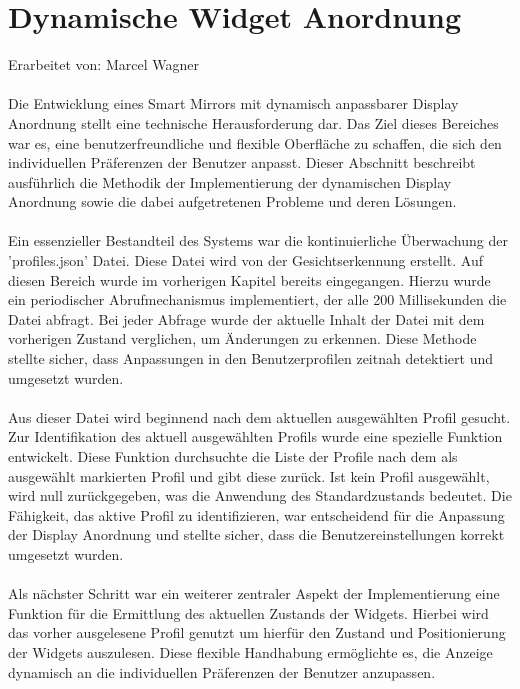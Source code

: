 \section{Dynamische Widget Anordnung}
Erarbeitet von: Marcel Wagner \\ \\
Die Entwicklung eines Smart Mirrors mit dynamisch anpassbarer Display Anordnung stellt eine technische Herausforderung dar. Das Ziel dieses Bereiches war es, eine benutzerfreundliche und flexible Oberfläche zu schaffen, die sich den individuellen Präferenzen der Benutzer anpasst. Dieser Abschnitt beschreibt ausführlich die Methodik der Implementierung der dynamischen Display Anordnung sowie die dabei aufgetretenen Probleme und deren Lösungen. \\ \\
Ein essenzieller Bestandteil des Systems war die kontinuierliche Überwachung der 'profiles.json' Datei. Diese Datei wird von der Gesichtserkennung erstellt. Auf diesen Bereich wurde im vorherigen Kapitel bereits eingegangen. Hierzu wurde ein periodischer Abrufmechanismus implementiert, der alle 200 Millisekunden die Datei abfragt. Bei jeder Abfrage wurde der aktuelle Inhalt der Datei mit dem vorherigen Zustand verglichen, um Änderungen zu erkennen. Diese Methode stellte sicher, dass Anpassungen in den Benutzerprofilen zeitnah detektiert und umgesetzt wurden. \\ \\
Aus dieser Datei wird beginnend nach dem aktuellen ausgewählten Profil gesucht. Zur Identifikation des aktuell ausgewählten Profils wurde eine spezielle Funktion entwickelt. Diese Funktion durchsuchte die Liste der Profile nach dem als ausgewählt markierten Profil und gibt diese zurück. Ist kein Profil ausgewählt, wird null zurückgegeben, was die Anwendung des Standardzustands bedeutet. Die Fähigkeit, das aktive Profil zu identifizieren, war entscheidend für die Anpassung der Display Anordnung und stellte sicher, dass die Benutzereinstellungen korrekt umgesetzt wurden. \\ \\
Als nächster Schritt war ein weiterer zentraler Aspekt der Implementierung eine Funktion für die Ermittlung des aktuellen Zustands der Widgets. Hierbei wird das vorher ausgelesene Profil genutzt um hierfür den Zustand und Positionierung der Widgets auszulesen. Diese flexible Handhabung ermöglichte es, die Anzeige dynamisch an die individuellen Präferenzen der Benutzer anzupassen. \\ \\
